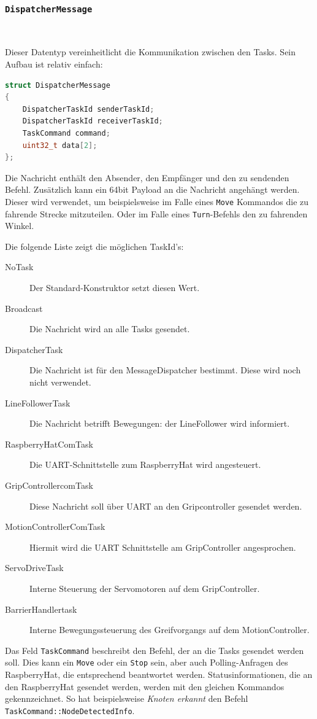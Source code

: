 \documentclass[main.tex]{subfiles} %
\begin{document}
\subsubsection*{\texttt{DispatcherMessage}}~\label{apdx:DispatcherMessage}

Dieser Datentyp vereinheitlicht die Kommunikation zwischen den Tasks. Sein
Aufbau ist relativ einfach:

\begin{lstlisting}[language=C++, style=CppStyle, caption={Prototyp DispatcherMessage}]
struct DispatcherMessage
{
    DispatcherTaskId senderTaskId;
    DispatcherTaskId receiverTaskId;
    TaskCommand command;
    uint32_t data[2];
};
\end{lstlisting}

Die Nachricht enthält den Absender, den Empfänger und den zu sendenden Befehl.
Zusätzlich kann ein 64bit Payload an die Nachricht angehängt werden. Dieser
wird verwendet, um beispielsweise im Falle eines \texttt{Move} Kommandos die zu
fahrende Strecke mitzuteilen. Oder im Falle eines \texttt{Turn}-Befehls den zu
fahrenden Winkel.

Die folgende Liste zeigt die möglichen TaskId's:
\begin{description}
    \item[NoTask] Der Standard-Konstruktor setzt diesen Wert.
    \item[Broadcast] Die Nachricht wird an alle Tasks gesendet.
    \item[DispatcherTask] Die Nachricht ist für den MessageDispatcher bestimmt. Diese
        wird noch nicht verwendet.
    \item[LineFollowerTask] Die Nachricht betrifft Bewegungen: der LineFollower wird
        informiert.
    \item[RaspberryHatComTask] Die UART-Schnittstelle zum RaspberryHat wird angesteuert.
    \item[GripControllercomTask] Diese Nachricht soll über UART an den Gripcontroller
        gesendet werden.
    \item[MotionControllerComTask] Hiermit wird die UART Schnittstelle am GripController
        angesprochen.
    \item[ServoDriveTask] Interne Steuerung der Servomotoren auf dem GripController.
    \item[BarrierHandlertask] Interne Bewegungssteuerung des Greifvorgangs auf dem
        MotionController.
\end{description}

Das Feld \texttt{TaskCommand} beschreibt den Befehl, der an die Tasks gesendet
werden soll. Dies kann ein \texttt{Move} oder ein \texttt{Stop} sein, aber auch
Polling-Anfragen des RaspberryHat, die entsprechend beantwortet werden.
Statusinformationen, die an den RaspberryHat gesendet werden, werden mit den
gleichen Kommandos gekennzeichnet. So hat beispielsweise \textit{Knoten
    erkannt} den Befehl \texttt{TaskCommand::NodeDetectedInfo}.
\end{document}

